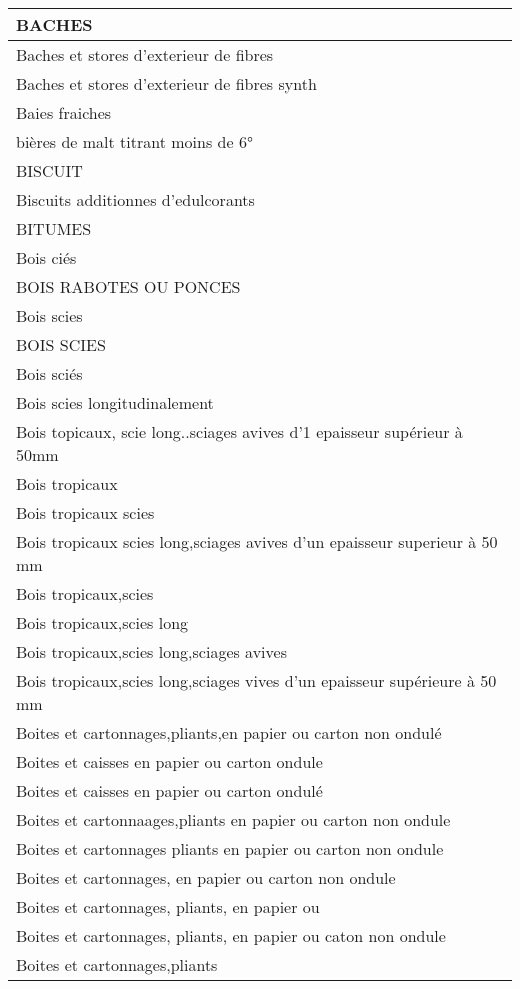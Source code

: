 \documentclass[
]{book}
\begin{document}
\begin{table}
\begin{tabular}[t]{l}
\hline
BACHES\\
\hline
Baches et stores d'exterieur de fibres\\
\hline
Baches et stores d'exterieur de fibres synth\\
\hline
Baies fraiches\\
\hline
bières de malt titrant moins de 6°\\
\hline
BISCUIT\\
\hline
Biscuits additionnes d'edulcorants\\
\hline
BITUMES\\
\hline
Bois ciés\\
\hline
BOIS RABOTES OU PONCES\\
\hline
Bois scies\\
\hline
BOIS SCIES\\
\hline
Bois sciés\\
\hline
Bois scies longitudinalement\\
\hline
Bois topicaux, scie long..sciages avives d'1 epaisseur supérieur à 50mm\\
\hline
Bois tropicaux\\
\hline
Bois tropicaux scies\\
\hline
Bois tropicaux scies long,sciages avives d'un epaisseur superieur à 50 mm\\
\hline
Bois tropicaux,scies\\
\hline
Bois tropicaux,scies long\\
\hline
Bois tropicaux,scies long,sciages avives\\
\hline
Bois tropicaux,scies long,sciages vives d'un epaisseur supérieure à 50 mm\\
\hline
Boites  et cartonnages,pliants,en papier ou carton non ondulé\\
\hline
Boites et caisses en papier ou carton ondule\\
\hline
Boites et caisses en papier ou carton ondulé\\
\hline
Boites et cartonnaages,pliants en papier ou carton non ondule\\
\hline
Boites et cartonnages pliants en papier ou carton non ondule\\
\hline
Boites et cartonnages, en papier ou carton non ondule\\
\hline
Boites et cartonnages, pliants, en papier ou\\
\hline
Boites et cartonnages, pliants, en papier ou caton non ondule\\
\hline
Boites et cartonnages,pliants\\

\end{tabular}
\end{table}
\end{document}
